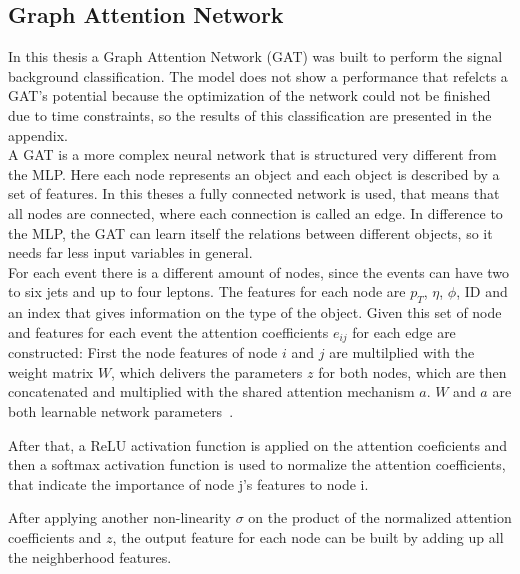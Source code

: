 \label{sec:appendix}

\subsection*{Graph Attention Network}

In this thesis a Graph Attention Network (GAT) was built to perform the signal background classification. The model does not show a performance that refelcts a GAT's potential
because the optimization of the network could not be finished due to time constraints, so the results of this classification are presented in the appendix. \\

A GAT is a more complex neural network that is structured very different from the MLP. Here each node represents an object and each object is described by a set of features. 
In this theses a fully connected network is used, that means that all nodes are connected, where each connection is called an edge.
In difference to the MLP, the GAT can learn itself the relations between different objects, so it needs far less input variables in general. \\

For each event there is a different amount of nodes, since the events can have two to six jets and up to four leptons. The features for each node are $p_T$, $\eta$, $\phi$, ID and an index that gives information on the 
type of the object. Given this set of node and features for each event the attention coefficients $e_{ij}$
for each edge are constructed: First the node features of node $i$ and $j$ are multilplied with the weight matrix $W$, which delivers the parameters $z$ for both nodes, which are then concatenated
and multiplied with the shared attention mechanism $a$. $W$ and $a$ are both learnable network parameters~\cite{GAT:2018}.


After that, a ReLU activation function is applied on the attention coeficients and then a softmax activation function is used to normalize the attention coefficients, that indicate the importance of 
node j's features to node i. 


After applying another non-linearity $\sigma$ on the product of the normalized attention coefficients and $z$, the output feature for each node can be built by adding up all the neighberhood features.

